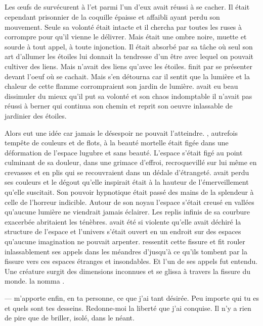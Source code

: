 \subsection{\Ogo}

Les œufs de \Tot survécurent à l'\Extinction et parmi l'un d'eux \Ogo avait réussi à se cacher. Il était cependant prisonnier de la coquille épaisse et affaibli ayant perdu son mouvement. Seule sa volonté était intacte et il chercha par toutes les ruses à corrompre \carac pour qu'il vienne le délivrer. Mais \carac était une ombre noire, muette et sourde à tout appel, à toute injonction. Il était absorbé par sa tâche où seul son art d'allumer les étoiles lui donnait la tendresse d'un être avec lequel on pouvait cultiver des liens. Mais \carac n'avait des liens qu'avec les étoiles. \carac finit par se présenter devant l'oeuf où \Ogo se cachait. Mais \carac s'en détourna car il sentit que la lumière et la chaleur de cette flamme corrompraient son jardin de lumière. \Ogo avait eu beau dissimuler du mieux qu'il put sa volonté et son chaos indomptable il n'avait pas réussi à berner \carac qui continua son chemin et reprit son oeuvre inlassable de jardinier des étoiles. 

Alors \Ogo eut une idée car jamais le désespoir ne pouvait l'atteindre. \auga, autrefois tempête de couleurs et de flots, à la beauté mortelle était figée dans une déformation de l'espace lugubre et sans beauté. L'espace s'était figé au point culminant de sa douleur, dans une grimace d'effroi, recroquevillé sur lui même en crevasses et en plis qui se recouvraient dans un dédale d'étrangeté. \auga avait perdu ses couleurs et le dégout qu'elle inspirait était à la hauteur de l'émerveillement qu'elle suscitait. Son pouvoir hypnotique était passé des mains de la splendeur à celle de l'horreur indicible. Autour de son noyau l'espace s'était creusé en vallées qu'aucune lumière ne viendrait jamais éclairer. Les replis infinis de sa courbure exacerbée abritaient les ténèbres. \auga avait été si violente qu'elle avait déchiré la structure de l'espace et l'univers s'était ouvert en un endroit sur des espaces qu'aucune imagination ne pouvait arpenter. \Ogo ressentit cette fissure et fit rouler inlassablement ses appels dans les méandres d'\auga jusqu'à ce qu'ils tombent par la fissure vers ces espaces étranges et insondables. Et l'un de ses appels fut entendu. Une créature surgit des dimensions inconnues et se glissa à travers la fissure du monde. \Ogo la nomma \Shuru.

--- \auga m'apporte enfin, en ta personne, ce que j'ai tant désirée. Peu importe qui tu es et quels sont tes desseins. Redonne-moi la liberté que j'ai conquise. Il n'y a rien de pire que de briller, isolé, dans le néant. \n

